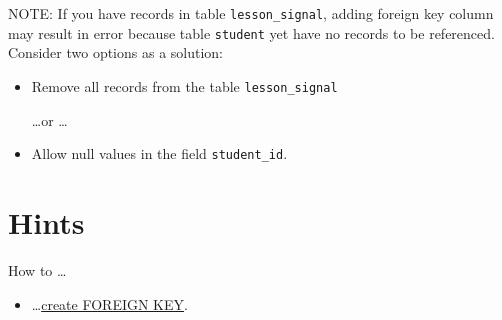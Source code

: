 \documentclass[12pt]{article}
\newcommand{\code}[1]{\texttt{#1}}
\begin{document}
NOTE: If you have records in table \code{lesson\_signal}, adding foreign key column may result in error because table \code{student} yet have no records to be referenced. Consider two options as a solution:

\begin{itemize}

\item Remove all records from the table \code{lesson\_signal}

\dots or \dots

\item Allow null values in the field \code{student\_id}.

\end{itemize}


\clearpage

\section*{Hints}
How to \dots
\begin{itemize}
\item \dots \href{https://dev.mysql.com/doc/refman/5.6/en/create-table-foreign-keys.html}{create FOREIGN KEY}.
\end{itemize}
\end{document}
